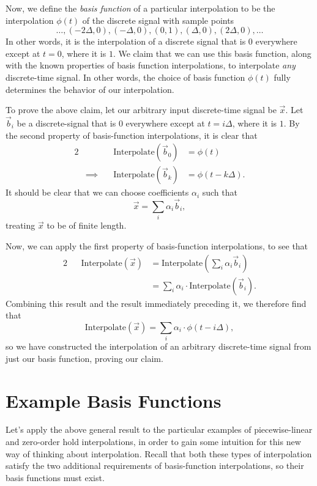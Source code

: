 \documentclass[letterpaper]{article}
\theoremstyle{remark}
\newcommand{\eqn}[1]{\begin{alignat*}{2}#1\end{alignat*}}
\newcommand*{\thus}{&\implies\quad&}
\begin{document}
Now, we define the \emph{basis function} of a particular interpolation to be the interpolation $\phi(t)$ of the discrete signal with sample points
\[
    \ldots, (-2\Delta, 0), (-\Delta, 0), (0, 1), (\Delta, 0), (2\Delta, 0), \ldots
\]
In other words, it is the interpolation of a discrete signal that is $0$ everywhere except at $t = 0$, where it is $1$. We claim that we can use this basis function, along with the known properties of basis function interpolations, to interpolate \emph{any} discrete-time signal. In other words, the choice of basis function $\phi(t)$ fully determines the behavior of our interpolation.

To prove the above claim, let our arbitrary input discrete-time signal be $\vec{x}$. Let $\vec{b}_i$ be a discrete-signal that is $0$ everywhere except at $t = i\Delta$, where it is $1$. By the second property of basis-function interpolations, it is clear that
\eqn{
    && \mathrm{Interpolate}(\vec{b}_0) &= \phi(t) \\
    \thus \mathrm{Interpolate}(\vec{b}_k) &= \phi(t - k\Delta).
}
It should be clear that we can choose coefficients $\alpha_i$ such that
\[
    \vec{x} = \sum_i \alpha_i \vec{b}_i,
\]
treating $\vec{x}$ to be of finite length.

Now, we can apply the first property of basis-function interpolations, to see that
\eqn{
    && \mathrm{Interpolate}(\vec{x}) &= \mathrm{Interpolate}(\sum_i \alpha_i \vec{b}_i) \\
    &&&= \sum_i \alpha_i \cdot \mathrm{Interpolate}(\vec{b}_i).
}
Combining this result and the result immediately preceding it, we therefore find that
\[
    \mathrm{Interpolate}(\vec{x}) = \sum_i \alpha_i \cdot \phi(t - i\Delta),
\]
so we have constructed the interpolation of an arbitrary discrete-time signal from just our basis function, proving our claim.

\section{Example Basis Functions}
Let's apply the above general result to the particular examples of piecewise-linear and zero-order hold interpolations, in order to gain some intuition for this new way of thinking about interpolation. Recall that both these types of interpolation satisfy the two additional requirements of basis-function interpolations, so their basis functions must exist.
\end{document}
